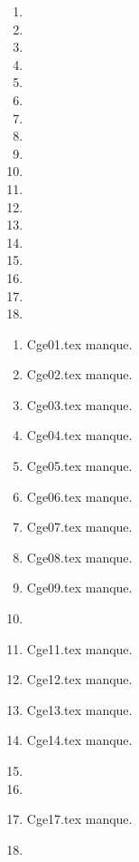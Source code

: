  
 
\begin{enumerate}
  \item  
  \item  
  \item  
  \item  
  \item  
  \item  
  \item  
  \item  
  \item  
  \item  
  \item  
  \item  
  \item  
  \item  
  \item  
  \item  
  \item  
  \item  
\end{enumerate} 
\clearpage 
{}
\begin{enumerate}
  \item Cge01.tex manque. 
  \item Cge02.tex manque. 
  \item Cge03.tex manque. 
  \item Cge04.tex manque. 
  \item Cge05.tex manque. 
  \item Cge06.tex manque. 
  \item Cge07.tex manque. 
  \item Cge08.tex manque. 
  \item Cge09.tex manque. 
  \item  
  \item Cge11.tex manque. 
  \item Cge12.tex manque. 
  \item Cge13.tex manque. 
  \item Cge14.tex manque. 
  \item  
  \item  
  \item Cge17.tex manque. 
  \item  
\end{enumerate} 
